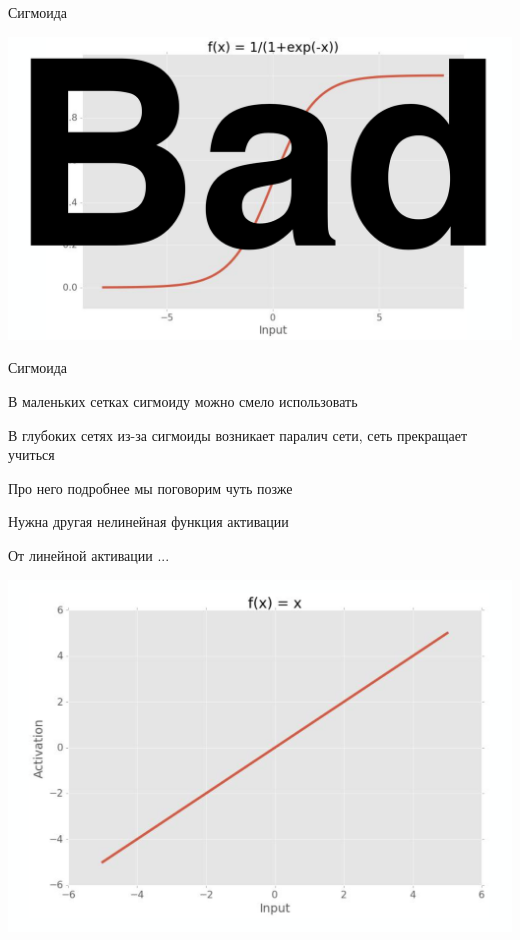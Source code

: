 \documentclass[notes,12pt, aspectratio=169]{beamer}
\newenvironment{wideitemize}{\itemize\addtolength{\itemsep}{10pt}}{\enditemize}
\begin{document}
\begin{frame}{Сигмоида}
\begin{center}
	\includegraphics[width=0.7\paperwidth]{activation_3.png}
\end{center}
\end{frame}


\begin{frame}{Сигмоида}
\begin{wideitemize}
	\item В маленьких сетках сигмоиду можно смело использовать
	\item В глубоких сетях из-за сигмоиды возникает \alert{паралич сети,} сеть прекращает учиться 
	\item Про него подробнее мы поговорим чуть позже 
	\item Нужна другая нелинейная функция активации 
\end{wideitemize}
\end{frame}


\begin{frame}{От линейной активации ... }
\begin{center}
	\includegraphics[width=0.7\paperwidth]{activation_1.png}
\end{center}
\end{frame}
\end{document}

